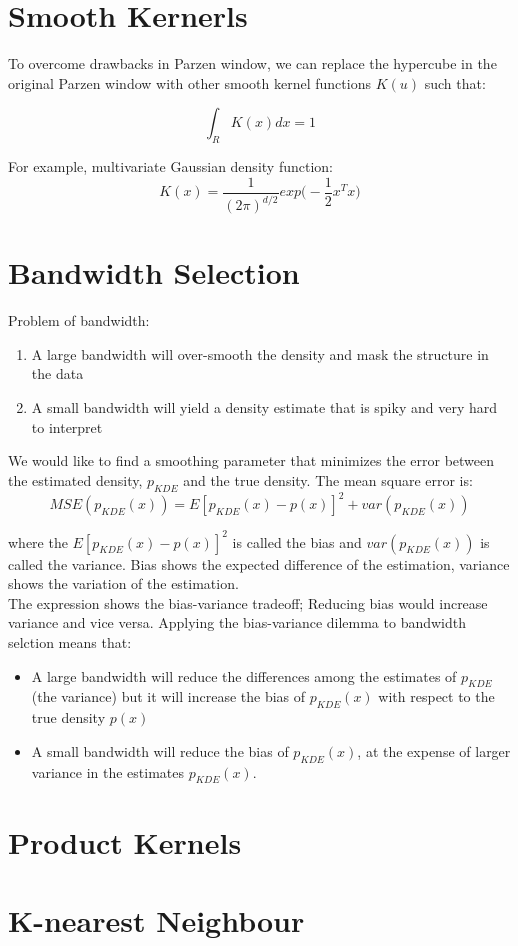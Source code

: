 \begin{multicols}{2}
\section{Smooth Kernerls}

\noindent To overcome drawbacks in Parzen window, we can replace the hypercube in the original Parzen window with other smooth kernel functions $K(u)$ such that:

$$\int_R K(x) dx = 1$$

\noindent For example, multivariate Gaussian density function:
$$K(x)=\frac{1}{(2 \pi)^{d/2}} exp \Big( - \frac{1}{2} x^T x\Big)$$

\section{Bandwidth Selection}

\noindent Problem of bandwidth:
\begin{enumerate}
    \item A large bandwidth will over-smooth the density and mask the structure in the data
    \item A small bandwidth will yield a density estimate that is spiky and very hard to interpret
\end{enumerate}

\noindent We would like to find a smoothing parameter that minimizes the error between the estimated density, $p_{KDE}$ and the true density. The mean square error is:
$$MSE(p_{KDE}(x)) = E[p_{KDE}(x) - p(x)]^2 + var(p_{KDE}(x))$$

\noindent where the $E[p_{KDE}(x) - p(x)]^2$ is called the bias and $var(p_{KDE}(x))$ is called the variance. Bias shows the expected difference of the estimation, variance shows the variation of the estimation. \\

\noindent The expression shows the bias-variance tradeoff; Reducing bias would increase variance and vice versa. Applying the bias-variance dilemma to bandwidth selction means that:
\begin{itemize}
    \item A large bandwidth will reduce the differences among the estimates of $p_{KDE}$ (the variance) but it will increase the bias of $p_{KDE}(x)$ with respect to the true density $p(x)$
    \item A small bandwidth will reduce the bias of $p_{KDE}(x)$, at the expense of larger variance in the estimates $p_{KDE}(x)$.
\end{itemize}

\section{Product Kernels}

\section{K-nearest Neighbour}
\end{multicols}